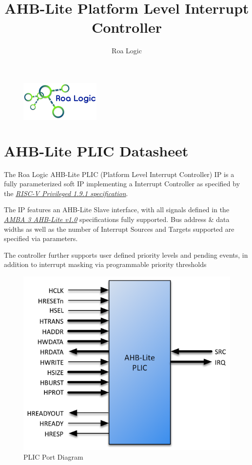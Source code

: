 \documentclass[]{article}
\title{AHB-Lite Platform Level Interrupt Controller}
\author{Roa Logic}
\date{}
\begin{document}
\begin{figure}
\centering
\includegraphics{../assets/graphics/RoaLogicLogo.png}
\caption{}
\end{figure}

\maketitle
\newpage
\tableofcontents
\newpage


\section{AHB-Lite PLIC Datasheet}

The Roa Logic AHB-Lite PLIC (Platform Level Interrupt Controller) IP is a fully parameterized soft IP implementing a Interrupt Controller as specified by the \emph{\href{https://people.eecs.berkeley.edu/\%7Ekrste/papers/riscv-privileged-v1.9.1.pdf}{RISC-V Privileged 1.9.1 specification}}.

The IP features an AHB-Lite Slave interface, with all signals defined in the \emph{\href{https://www.arm.com/products/system-ip/amba-specifications}{AMBA 3 AHB-Lite v1.0}} specifications fully supported. Bus address \& data widths as well as the number of Interrupt Sources and Targets supported are specified via parameters.

The controller further supports user defined priority levels and pending events, in addition to interrupt masking via programmable priority thresholds

\begin{figure}[h]
\centering
\includegraphics{../assets/graphics/AHB-Lite_PLIC_Port_Diagram.png}
\caption{PLIC Port Diagram}
\end{figure}
\end{document}
